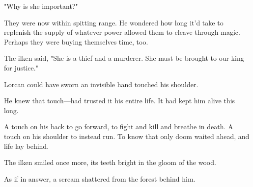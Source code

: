 "Why is she important?"

They were now within spitting range.
He wondered how long it'd take to replenish the supply of whatever power allowed them to cleave through magic.
Perhaps they were buying themselves time, too.

The ilken said, "She is a thief and a murderer.
She must be brought to our king for justice."

Lorcan could have sworn an invisible hand touched his shoulder.

He knew that touch---had trusted it his entire life.
It had kept him alive this long.

A touch on his back to go forward, to fight and kill and breathe in death.
A touch on his shoulder to instead run.
To know that only doom waited ahead, and life lay behind.

The ilken smiled once more, its teeth bright in the gloom of the wood.

As if in answer, a scream shattered from the forest behind him.
